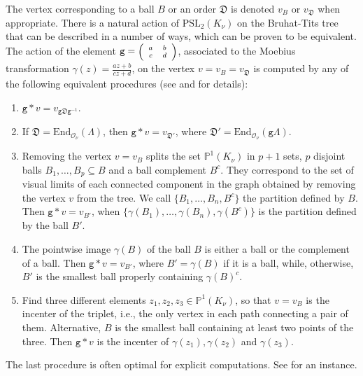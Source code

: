 \documentclass{article}
\theoremstyle{definition}
\theoremstyle{remark}
\newcommand\sbmattrix[4]{\textnormal{\scriptsize$\left(\begin{array}{cc}#1&#2\\#3&#4\end{array}\right)$\normalsize}}
\begin{document}
The vertex corresponding to a ball $B$ or an order $\mathfrak{D}$ is denoted
$v_B$ or $v_{\mathfrak{D}}$ when appropriate.
There is a natural action of $\mathrm{PSL}_2(K_{\nu})$ on the 
Bruhat-Tits tree that can be
described in a number of ways, which can be proven to be equivalent. The action
of the element $\mathtt{g}=\sbmattrix abcd$, associated to the
Moebius transformation $\gamma(z)=\frac{az+b}{cz+d}$,
on the vertex $v=v_B=v_{\mathfrak{D}}$ 
is computed by any of the following equivalent
procedures (see \cite[\S4]{AAC18} and \cite[\S3]{AB24} for details):
\begin{enumerate}[label=($\spadesuit$\bf{\arabic*})]
    \item $\mathtt{g}*v=v_{\mathtt{g}\mathfrak{D}\mathtt{g}^{-1}}$.
    \item If $\mathfrak{D}=\mathrm{End}_{\mathcal{O}_\nu}(\Lambda)$,
    then $\mathtt{g}*v=v_{\mathfrak{D}'}$, where
    $\mathfrak{D}'=\mathrm{End}_{\mathcal{O}_\nu}(\mathtt{g}\Lambda)$.
    \item Removing the vertex $v=v_B$ splits the set $\mathbb{P}^1(K_{\nu})$
    in $p+1$ sets, $p$ disjoint balls $B_1,\dots,B_p\subseteq B$ and a 
    ball complement $B^c$. They correspond to the set of visual limits
    of each connected component in the graph obtained by removing
    the vertex $v$ from the tree. We call $\{B_1,\dots,B_n,B^c\}$
    the partition defined by $B$. Then $\mathtt{g}*v=v_{B'}$, when
    $\{\gamma(B_1),\dots,\gamma(B_n),\gamma(B^c)\}$ is the partition 
    defined by the ball $B'$.
    \item The pointwise image $\gamma(B)$ of the ball $B$ is either a ball
    or the complement of a ball. Then $\mathtt{g}*v=v_{B'}$, where
    $B'=\gamma(B)$ if it is a ball, while, otherwise, $B'$ is
    the smallest ball properly containing $\gamma(B)^c$.
    \item\label{sic} Find three different  elements $z_1,z_2,z_3\in\mathbb{P}^1(K_{\nu})$, 
    so that $v=v_B$ is the incenter of the triplet, i.e., 
    the only vertex in each path connecting a pair of them. 
    Alternative, $B$ is the smallest ball containing at least two 
    points of the three. Then $\mathtt{g}*v$ is the incenter of
    $\gamma(z_1),\gamma(z_2)$ and $\gamma(z_3)$.
\end{enumerate}
The last procedure is often optimal for explicit computations.
See \cite{AB24} for an instance.
\end{document}

